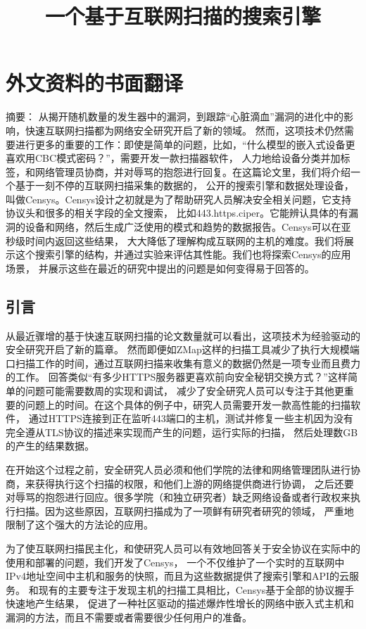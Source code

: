 \chapter{外文资料的书面翻译}

\title{一个基于互联网扫描的搜索引擎}

{\heiti 摘要：} 从揭开随机数量的发生器中的漏洞，到跟踪“心脏滴血”漏洞的进化中的影响，快速互联网扫描都为网络安全研究开启了新的领域。
然而，这项技术仍然需要进行更多的重要的工作：即使是简单的问题，比如，“什么模型的嵌入式设备更喜欢用CBC模式密码？”，需要开发一款扫描器软件，
人力地给设备分类并加标签，和网络管理员协商，并对辱骂的抱怨进行回复。在这篇论文里，我们将介绍一个基于一刻不停的互联网扫描采集的数据的，
公开的搜索引擎和数据处理设备，叫做Censys。Censys设计之初就是为了帮助研究人员解决安全相关问题，它支持协议头和很多的相关字段的全文搜索，
比如443.https.ciper。它能辨认具体的有漏洞的设备和网络，然后生成广泛使用的模式和趋势的数据报告。Censys可以在亚秒级时间内返回这些结果，
大大降低了理解构成互联网的主机的难度。我们将展示这个搜索引擎的结构，并通过实验来评估其性能。我们也将探索Censys的应用场景，
并展示这些在最近的研究中提出的问题是如何变得易于回答的。

\section{引言}
从最近骤增的基于快速互联网扫描的论文数量就可以看出，这项技术为经验驱动的安全研究开启了新的篇章。
然而即便如ZMap这样的扫描工具减少了执行大规模端口扫描工作的时间，通过互联网扫描来收集有意义的数据仍然是一项专业而且费力的工作。
回答类似“有多少HTTPS服务器更喜欢前向安全秘钥交换方式？”这样简单的问题可能需要数周的实现和调试，
减少了安全研究人员可以专注于其他更重要的问题上的时间。在这个具体的例子中，研究人员需要开发一款高性能的扫描软件，
通过HTTPS连接到正在监听443端口的主机，测试并修复一些主机因为没有完全遵从TLS协议的描述来实现而产生的问题，运行实际的扫描，
然后处理数GB的产生的结果数据。

在开始这个过程之前，安全研究人员必须和他们学院的法律和网络管理团队进行协商，来获得执行这个扫描的权限，和他们上游的网络提供商进行协调，
之后还要对辱骂的抱怨进行回应。很多学院（和独立研究者）缺乏网络设备或者行政权来执行扫描。因为这些原因，互联网扫描成为了一项鲜有研究者研究的领域，
严重地限制了这个强大的方法论的应用。

为了使互联网扫描民主化，和使研究人员可以有效地回答关于安全协议在实际中的使用和部署的问题，我们开发了Censys，
一个不仅维护了一个实时的互联网中IPv4地址空间中主机和服务的快照，而且为这些数据提供了搜索引擎和API的云服务。
和现有的主要专注于发现主机的扫描工具相比，Censys基于全部的协议握手快速地产生结果，
促进了一种社区驱动的描述爆炸性增长的网络中嵌入式主机和漏洞的方法，而且不需要或者需要很少任何用户的准备。


